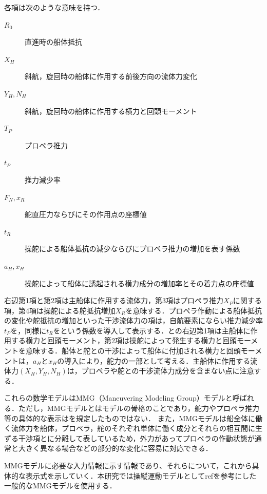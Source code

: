 各項は次のような意味を持つ．

\begin{description}
    \item[$R_0$]直進時の船体抵抗
    \item[$X_H$]斜航，旋回時の船体に作用する前後方向の流体力変化
    \item[$Y_H, N_H$]斜航，旋回時の船体に作用する横力と回頭モーメント
    \item[$T_P$]プロペラ推力
    \item[$t_P$]推力減少率
    \item[$F_N,x_R$]舵直圧力ならびにその作用点の座標値
    \item[$t_R$]操舵による船体抵抗の減少ならびにプロペラ推力の増加を表す係数
    \item[$a_H, x_H$]操舵によって船体に誘起される横力成分の増加率とその着力点の座標値
\end{description}

右辺第1項と第2項は主船体に作用する流体力，第3項はプロペラ推力$X_P$に関する項，第4項は操舵による舵抵抗増加$X_R$を意味する．プロペラ作動による船体抵抗の変化や舵抵抗の増加といった干渉流体力の項は，自航要素にならい推力減少率$t_P$を，同様に$t_R$をという係数を導入して表示する．との右辺第1項は主船体に作用する横力と回頭モーメント，第2項は操舵によって発生する横力と回頭モーメントを意味する．船体と舵との干渉によって船体に付加される横力と回頭モーメントは，$a_H$と$x_H$の導入により，舵力の一部として考える．主船体に作用する流体力$(X_H,Y_H,N_H )$は，プロペラや舵との干渉流体力成分を含まない点に注意する．

これらの数学モデルはMMG（Maneuvering Modeling Group）モデルと呼ばれる．ただし，MMGモデルとはモデルの骨格のことであり，舵力やプロペラ推力等の具体的な表示はを規定したものではない． また，MMGモデルは船全体に働く流体力を船体，プロペラ，舵のそれぞれ単体に働く成分とそれらの相互間に生ずる干渉項とに分離して表しているため，外力があってプロペラの作動状態が通常と大きく異なる場合などの部分的な変化に容易に対応できる．

MMGモデルに必要な入力情報に示す情報であり、それらについて，これから具体的な表示式を示していく．本研究では操縦運動モデルとしてrefを参考にした一般的なMMGモデルを使用する．

